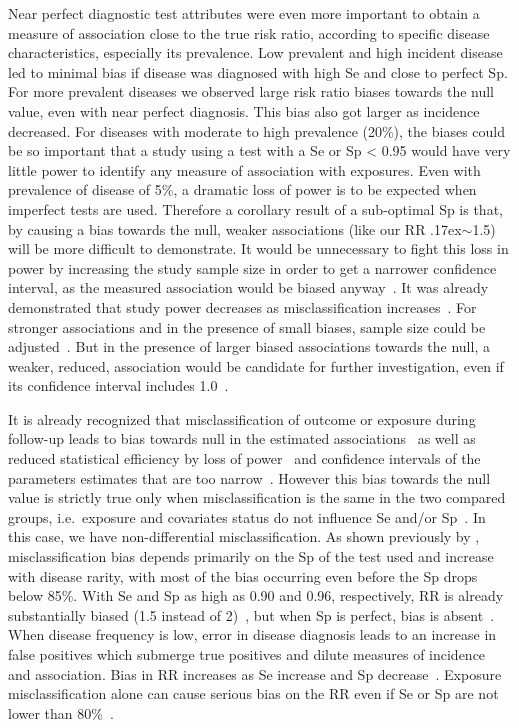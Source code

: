 \documentclass[utf8]{frontiersSCNS}\usepackage[]{graphicx}\usepackage[]{color}
\begin{document}
Near perfect diagnostic test attributes were even more important to obtain a
measure of association close to the true risk ratio, according to specific
disease characteristics, especially its prevalence.
Low prevalent and high incident disease led to minimal bias if disease was
diagnosed with high Se and close to perfect Sp.
For more prevalent diseases we observed large risk ratio biases towards the
null value, even with near perfect diagnosis.
This bias also got larger as incidence decreased.
For diseases with moderate to high prevalence (20\%), the biases could be so
important that a study using a test with a Se or Sp < 0.95
would have very little power to identify any measure of association with
exposures.
Even with prevalence of disease of 5\%, a dramatic loss of power is to be
expected when imperfect tests are used.
Therefore a corollary result of a sub-optimal Sp is that, by causing a bias
towards the null, weaker associations (like our RR
\raise.17ex\hbox{$\scriptstyle\sim$}\num{1.5}) will be more difficult to
demonstrate.
It would be unnecessary to fight this loss in power by increasing the study
sample size in order to get a narrower confidence interval, as the measured
association would be biased anyway~\citep{Brenner_1990}.
It was already demonstrated that study power decreases as misclassification
increases~\citep{Brown_2010}.
For stronger associations and in the presence of small biases, sample size could
be adjusted~\citep{Dendukuri_2004,Cheng_2009}.
But in the presence of larger biased associations towards the null, a weaker,
reduced, association would be candidate for further investigation, even if its
confidence interval includes \num{1.0}~\citep{Baird_1991}.

It is already recognized that misclassification of outcome or exposure during
follow-up leads to bias towards null in the estimated
associations~\citep{Bross1954,Copeland1977,FLEGAL_1986} as well as reduced
statistical efficiency by loss of power~\citep{WHITE_1986} and confidence
intervals of the parameters estimates that are too narrow~\citep{Neuhaus_1999}.
However this bias towards the null value is strictly true only when
misclassification is the same in the two compared groups, i.e.\ exposure and
covariates status do not influence Se and/or
Sp~\citep{Copeland1977,Sorahan_1994,Neuhaus_1999}.
In this case, we have non-differential misclassification.
As shown previously by \cite{Copeland1977}, misclassification bias depends
primarily on the Sp of the test used and increase with disease rarity, with most
of the bias occurring even before the Sp drops below 85\%.
With Se and Sp as high as 0.90 and 0.96, respectively, RR is already
substantially biased (1.5 instead of 2)~\citep{Copeland1977}, but when Sp is
perfect, bias is absent~\citep{Poole1985}.
When disease frequency is low, error in disease diagnosis leads to an increase
in false positives which submerge true positives and dilute measures of
incidence and association.
Bias in RR increases as Se increase and Sp decrease~\citep{WHITE_1986}.
Exposure misclassification alone can cause serious bias on the RR even if Se or
Sp are not lower than 80\%~\citep{Kristensen_1992}.
\end{document}
